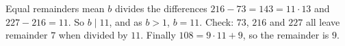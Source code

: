 Equal remainders mean $b$ divides the differences $216-73=143=11\cdot13$ and $227-216=11$. So $b\mid11$, and as $b>1$, $b=11$. Check: $73$, $216$ and $227$ all leave remainder $7$ when divided by $11$. Finally $108=9\cdot11+9$, so the remainder is $\boxed{9}$.
